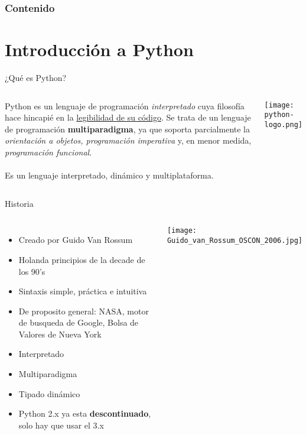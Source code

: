 \begin{frame}
    \frametitle{Contenido}
    \tableofcontents
\end{frame}

\section{Introducción a Python}

\begin{frame}[c]{¿Qué es Python?}
    \begin{columns}
        Python es un lenguaje de programación \textit{interpretado} cuya
        filosofía hace hincapié en la \underline{legibilidad de su código}.
        Se trata de un lenguaje de programación \textbf{multiparadigma}, ya
        que soporta parcialmente la \textit{orientación a objetos,
        programación imperativa} y, en menor medida, \textit{programación
        funcional}. \\~\\

        Es un lenguaje interpretado, dinámico y multiplataforma. 
        \begin{center}
            \texttt{[image: python-logo.png]}
        \end{center}
    \end{columns}
\end{frame}

\begin{frame}[c]{Historia}
  \begin{columns}
    \begin{itemize}
      \item Creado por Guido Van Rossum
      \item Holanda principios de la decade de los 90's
      \item Sintaxis simple, práctica e intuitiva
      \item De proposito general: NASA, motor de busqueda de Google, Bolsa de
        Valores de Nueva York
      \item Interpretado
      \item Multiparadigma
      \item Tipado dinámico
      \item Python 2.x ya esta \textbf{descontinuado}, solo hay que usar el 3.x
    \end{itemize}
        \begin{center}
            \texttt{[image: Guido\_van\_Rossum\_OSCON\_2006.jpg]}
        \end{center}
  \end{columns}
\end{frame}

